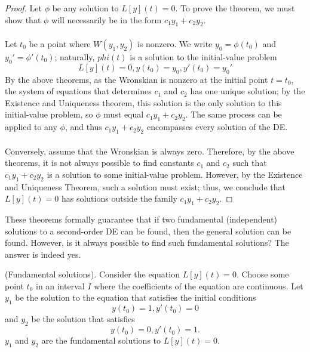 \documentclass{article}
\begin{document}
\begin{proof}
    Let $\phi$ be any solution to $L[y](t)=0$. To prove the theorem, we must show that $\phi$ will necessarily be in the form $c_1 y_1 + c_2 y_2$. \\ \\
    Let $t_0$ be a point where $W(y_1,y_2)$ is nonzero. We write $y_0 = \phi(t_0)$ and $y_0' = \phi'(t_0)$; naturally, $phi(t)$ is a solution to the initial-value problem
    \begin{equation*}
        L[y](t) = 0, y(t_0) = y_0, y'(t_0) = y_0'
    \end{equation*}
    By the above theorems, as the Wronskian is nonzero at the initial point $t = t_0$, the system of equations that determines $c_1$ and $c_2$ has one unique solution; by the Existence and Uniqueness theorem, this solution is the only solution to this initial-value problem, so $\phi$ must equal $c_1 y_1 + c_2 y_2$. The same process can be applied to any $\phi$, and thus $c_1 y_1 + c_2 y_2$ encompasses every solution of the DE. \\ \\
    Conversely, assume that the Wronskian is always zero. Therefore, by the above theorems, it is not always possible to find constants $c_1$ and $c_2$ such that $c_1y_1 + c_2y_2$ is a solution to some initial-value problem. However, by the Existence and Uniqueness Theorem, such a solution must exist; thus, we conclude that $L[y](t) = 0$ has solutions outside the family $c_1y_1 + c_2y_2$. 
\end{proof}
These theorems formally guarantee that if two fundamental (independent) solutions to a second-order DE can be found, then the general solution can be found. However, is it always possible to find such fundamental solutions? The answer is indeed yes.
\begin{theorem}
    (Fundamental solutions). Consider the equation $L[y](t)=0$. Choose some point $t_0$ in an interval $I$ where the coefficients of the equation are continuous. Let $y_1$ be the solution to the equation that satisfies the initial conditions
    \begin{equation*}
        y(t_0) = 1, y'(t_0) =0
    \end{equation*}
    and $y_2$ be the solution that satisfies
    \begin{equation*}
        y(t_0) = 0, y'(t_0) =1.
    \end{equation*}
    $y_1$ and $y_2$ are the fundamental solutions to $L[y](t)=0$.
\end{theorem}
\end{document}
